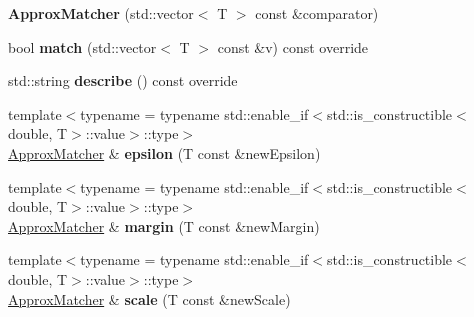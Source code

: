 \begin{DoxyCompactItemize}
\item 
\mbox{\label{structCatch_1_1Matchers_1_1Vector_1_1ApproxMatcher_a55e8f7018104e0730eef656a61646870}} 
{\bfseries Approx\+Matcher} (std\+::vector$<$ T $>$ const \&comparator)
\item 
\mbox{\label{structCatch_1_1Matchers_1_1Vector_1_1ApproxMatcher_a9cbd62093c4c123f1984726e1a14b270}} 
bool {\bfseries match} (std\+::vector$<$ T $>$ const \&v) const override
\item 
\mbox{\label{structCatch_1_1Matchers_1_1Vector_1_1ApproxMatcher_a1a9237e24c513c1448fa0624b3e14232}} 
std\+::string {\bfseries describe} () const override
\item 
\mbox{\label{structCatch_1_1Matchers_1_1Vector_1_1ApproxMatcher_a319b3a7fa9d0f401bfda5b45dafbbf5a}} 
{\footnotesize template$<$typename  = typename std\+::enable\+\_\+if$<$std\+::is\+\_\+constructible$<$double, T$>$\+::value$>$\+::type$>$ }\\\hyperlink{structCatch_1_1Matchers_1_1Vector_1_1ApproxMatcher}{Approx\+Matcher} \& {\bfseries epsilon} (T const \&new\+Epsilon)
\item 
\mbox{\label{structCatch_1_1Matchers_1_1Vector_1_1ApproxMatcher_ac3b3afb3e5a9ad9ee0516e0202e08959}} 
{\footnotesize template$<$typename  = typename std\+::enable\+\_\+if$<$std\+::is\+\_\+constructible$<$double, T$>$\+::value$>$\+::type$>$ }\\\hyperlink{structCatch_1_1Matchers_1_1Vector_1_1ApproxMatcher}{Approx\+Matcher} \& {\bfseries margin} (T const \&new\+Margin)
\item 
\mbox{\label{structCatch_1_1Matchers_1_1Vector_1_1ApproxMatcher_a8658dc0564e0f80f101e4574830a3b18}} 
{\footnotesize template$<$typename  = typename std\+::enable\+\_\+if$<$std\+::is\+\_\+constructible$<$double, T$>$\+::value$>$\+::type$>$ }\\\hyperlink{structCatch_1_1Matchers_1_1Vector_1_1ApproxMatcher}{Approx\+Matcher} \& {\bfseries scale} (T const \&new\+Scale)
\end{DoxyCompactItemize}
